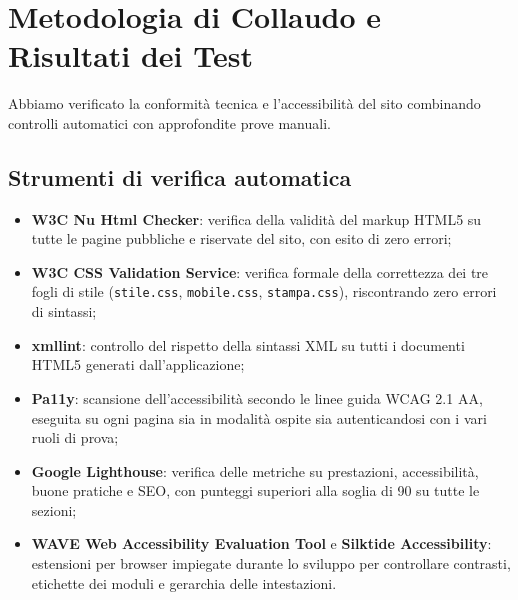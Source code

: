 \documentclass[a4paper,11pt]{article}
\begin{document}
\section{Metodologia di Collaudo e Risultati dei Test}

Abbiamo verificato la conformità tecnica e l'accessibilità del sito combinando controlli automatici con approfondite prove manuali.

\subsection{Strumenti di verifica automatica}
\begin{itemize}
    \item \textbf{W3C Nu Html Checker}: verifica della validità del markup HTML5 su tutte le pagine pubbliche e riservate del sito, con esito di zero errori;
    \item \textbf{W3C CSS Validation Service}: verifica formale della correttezza dei tre fogli di stile (\texttt{stile.css}, \texttt{mobile.css}, \texttt{stampa.css}), riscontrando zero errori di sintassi;
    \item \textbf{xmllint}: controllo del rispetto della sintassi XML su tutti i documenti HTML5 generati dall'applicazione;
    \item \textbf{Pa11y}: scansione dell'accessibilità secondo le linee guida WCAG 2.1 AA, eseguita su ogni pagina sia in modalità ospite sia autenticandosi con i vari ruoli di prova;
    \item \textbf{Google Lighthouse}: verifica delle metriche su prestazioni, accessibilità, buone pratiche e SEO, con punteggi superiori alla soglia di 90 su tutte le sezioni;
    \item \textbf{WAVE Web Accessibility Evaluation Tool} e \textbf{Silktide Accessibility}: estensioni per browser impiegate durante lo sviluppo per controllare contrasti, etichette dei moduli e gerarchia delle intestazioni.
\end{itemize}
\end{document}
